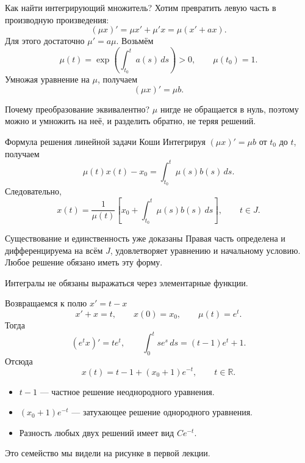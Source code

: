 \documentclass[aspectratio=169,11pt]{beamer}
\newcommand{\R}{\mathbb R}
\begin{document}
\begin{frame}{Как найти интегрирующий множитель?}
Хотим превратить левую часть в производную произведения:
\[
(\mu x)'=\mu x'+\mu'x=\mu(x'+ax).
\]
Для этого достаточно $\mu'=a\mu$. Возьмём
\[
\mu(t)=\exp\left(\int_{t_0}^t a(s)\,ds\right)>0,\qquad \mu(t_0)=1.
\]
Умножая уравнение на $\mu$, получаем
\[
\boxed{(\mu x)'=\mu b}.
\]
\begin{block}{Почему преобразование эквивалентно?}
$\mu$ нигде не обращается в нуль, поэтому можно и умножить на неё,
и разделить обратно, не теряя решений.
\end{block}
\end{frame}

\begin{frame}{Формула решения линейной задачи Коши}
Интегрируя $(\mu x)'=\mu b$ от $t_0$ до $t$, получаем
\[
\mu(t)x(t)-x_0=\int_{t_0}^t\mu(s)b(s)\,ds.
\]
Следовательно,
\[
\boxed{x(t)=\frac1{\mu(t)}
\left[x_0+\int_{t_0}^t\mu(s)b(s)\,ds\right]},\qquad t\in J.
\]
\begin{block}{Существование и единственность уже доказаны}
Правая часть определена и дифференцируема на всём $J$,
удовлетворяет уравнению и начальному условию.
Любое решение обязано иметь эту форму.
\end{block}
Интегралы не обязаны выражаться через элементарные функции.
\end{frame}

\begin{frame}{Возвращаемся к полю $x'=t-x$}
\[
x'+x=t,\qquad x(0)=x_0,\qquad \mu(t)=e^t.
\]
Тогда
\[
(e^tx)'=te^t,\qquad
\int_0^t se^s\,ds=(t-1)e^t+1.
\]
Отсюда
\[
\boxed{x(t)=t-1+(x_0+1)e^{-t}},\qquad t\in\R.
\]
\begin{itemize}
\item $t-1$ --- частное решение неоднородного уравнения.
\item $(x_0+1)e^{-t}$ --- затухающее решение однородного уравнения.
\item Разность любых двух решений имеет вид $Ce^{-t}$.
\end{itemize}
Это семейство мы видели на рисунке в первой лекции.
\end{frame}
\end{document}
